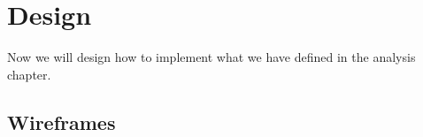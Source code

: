 \chapter{Design}

Now we will design how to implement what we have defined in the analysis chapter.

\section{Wireframes}


